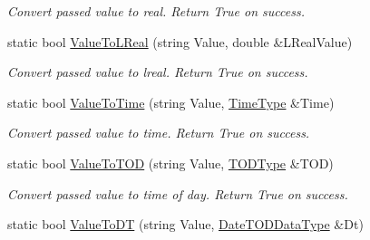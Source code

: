 \begin{DoxyCompactItemize}
\begin{DoxyCompactList}\small\item\em Convert passed value to real. Return True on success. \end{DoxyCompactList}\item 
static bool \hyperlink{classpc__emulator_1_1DataTypeUtils_ade1a844fd50a9001d71ff1e295019132}{Value\+To\+L\+Real} (string Value, double \&L\+Real\+Value)\hypertarget{classpc__emulator_1_1DataTypeUtils_ade1a844fd50a9001d71ff1e295019132}{}\label{classpc__emulator_1_1DataTypeUtils_ade1a844fd50a9001d71ff1e295019132}

\begin{DoxyCompactList}\small\item\em Convert passed value to lreal. Return True on success. \end{DoxyCompactList}\item 
static bool \hyperlink{classpc__emulator_1_1DataTypeUtils_a7bdb5617cf8054717f07b75b13735c52}{Value\+To\+Time} (string Value, \hyperlink{structpc__emulator_1_1TIMEDataType}{Time\+Type} \&Time)\hypertarget{classpc__emulator_1_1DataTypeUtils_a7bdb5617cf8054717f07b75b13735c52}{}\label{classpc__emulator_1_1DataTypeUtils_a7bdb5617cf8054717f07b75b13735c52}

\begin{DoxyCompactList}\small\item\em Convert passed value to time. Return True on success. \end{DoxyCompactList}\item 
static bool \hyperlink{classpc__emulator_1_1DataTypeUtils_abbce892d1d360df0839af7619a08498b}{Value\+To\+T\+OD} (string Value, \hyperlink{structpc__emulator_1_1TODDataType}{T\+O\+D\+Type} \&T\+OD)\hypertarget{classpc__emulator_1_1DataTypeUtils_abbce892d1d360df0839af7619a08498b}{}\label{classpc__emulator_1_1DataTypeUtils_abbce892d1d360df0839af7619a08498b}

\begin{DoxyCompactList}\small\item\em Convert passed value to time of day. Return True on success. \end{DoxyCompactList}\item 
static bool \hyperlink{classpc__emulator_1_1DataTypeUtils_a4c2c00be81221d68ad0378a2c1d5f4e1}{Value\+To\+DT} (string Value, \hyperlink{structpc__emulator_1_1DateTODDataType}{Date\+T\+O\+D\+Data\+Type} \&Dt)\hypertarget{classpc__emulator_1_1DataTypeUtils_a4c2c00be81221d68ad0378a2c1d5f4e1}{}\label{classpc__emulator_1_1DataTypeUtils_a4c2c00be81221d68ad0378a2c1d5f4e1}


\end{DoxyCompactItemize}
